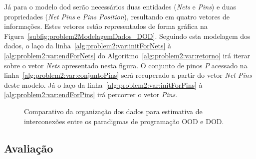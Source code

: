 Já para o modelo \ac{dod} serão necessários duas entidades (\textit{Nets} e \textit{Pins}) e duas propriedades (\textit{Net Pins} e \textit{Pins Position}), resultando em quatro vetores de informações. Estes vetores estão representados de forma gráfica na Figura~\ref{subfig:problem2ModelagemDados_DOD}.
Seguindo esta modelagem dos dados, o laço da linha~\ref{alg:problem2:var:initForNets} à \ref{alg:problem2:var:endForNets} do Algoritmo~\ref{alg:problem2:var:retorno} irá iterar sobre o vetor \textit{Nets} apresentado nesta figura. O conjunto de pinos $P$ acessado na linha~\ref{alg:problem2:var:conjuntoPins} será recuperado a partir do vetor \textit{Net Pins} deste modelo. Já o laço da linha~\ref{alg:problem2:var:initForPins} à \ref{alg:problem2:var:endForPins} irá percorrer o vetor \textit{Pins}.

\begin{figure}[ht]
    \centering
    \caption[Organização dos dados estudo de caso 2]{Comparativo da organização dos dados para estimativa de interconexões entre os paradigmas de programação OOD e DOD.}
    \label{fig:problem2ModelagemDados}
\end{figure}


\subsection{Avaliação}

